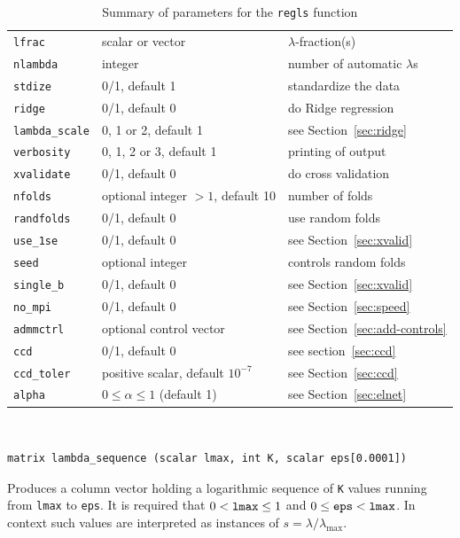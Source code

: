 \documentclass{article}
\newenvironment{funcdoc}
{\noindent\hrulefill\\[-12pt]}
{\medbreak}
\begin{document}
\begin{table}[htbp]
  \centering
  \begin{tabular}{lll}
    \texttt{lfrac} & scalar or vector & $\lambda$-fraction(s) \\
    \texttt{nlambda} & integer & number of automatic $\lambda$s \\
    \texttt{stdize} & 0/1, default 1 & standardize the data \\
    \texttt{ridge} & 0/1, default 0 & do Ridge regression \\
    \texttt{lambda\_scale} & 0, 1 or 2, default 1 & see Section~\ref{sec:ridge} \\
    \texttt{verbosity} & 0, 1, 2 or 3, default 1 & printing of output\\
    \texttt{xvalidate} & 0/1, default 0 & do cross validation\\
    \texttt{nfolds} & optional integer $>1$, default 10 & number of
                                                          folds \\
    \texttt{randfolds} & 0/1, default 0 & use random folds\\
    \texttt{use\_1se} & 0/1, default 0 & see Section~\ref{sec:xvalid} \\
    \texttt{seed} & optional integer & controls random folds\\
    \texttt{single\_b} & 0/1, default 0 & see Section~\ref{sec:xvalid}\\
    \texttt{no\_mpi} & 0/1, default 0 & see Section~\ref{sec:speed}\\
    \texttt{admmctrl} & optional control vector & see
                                                  Section~\ref{sec:add-controls} \\
    \texttt{ccd} & 0/1, default 0 & see section~\ref{sec:ccd} \\
    \texttt{ccd\_toler} & positive scalar, default $10^{-7}$ & see
                                                               Section~\ref{sec:ccd}\\
    \texttt{alpha} & $0 \leq \alpha \leq 1$ (default 1) & see
                                                               Section~\ref{sec:elnet}
  \end{tabular}
  \caption{Summary of parameters for the \texttt{regls} function}
  \label{tab:regls-parms}
\end{table}

\begin{funcdoc}
\begin{verbatim}
matrix lambda_sequence (scalar lmax, int K, scalar eps[0.0001])
\end{verbatim}
  Produces a column vector holding a logarithmic sequence of
  \texttt{K} values running from \texttt{lmax} to \texttt{eps}. It is
  required that $0 < \mbox{\texttt{lmax}} \le 1$ and
  $0 \le \mbox{\texttt{eps}} < \mbox{\texttt{lmax}}$. In context such
  values are interpreted as instances of $s = \lambda/\lambda_{\max}$.
\end{funcdoc}
\end{document}
